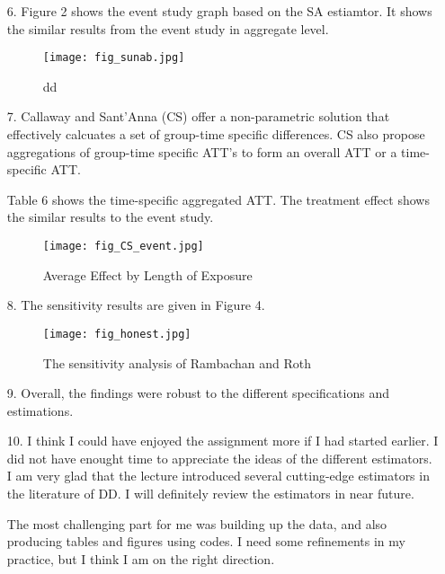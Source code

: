 \documentclass[12pt]{article}
\begin{document}
\begin{itemize}
		\item[6.] Figure 2 shows the event study graph based on the SA estiamtor. It shows the similar results from the event study in aggregate level.
		\begin{figure}
			\centering
			  \texttt{[image: fig\_sunab.jpg]}
			  \caption{dd}
		\end{figure}
		
		\item[7.] Callaway and Sant'Anna (CS) offer a non-parametric solution that effectively calcuates a set of group-time specific differences. CS also propose aggregations of group-time specific ATT's to form an overall ATT or a time-specific ATT.
		
		Table 6 shows the time-specific aggregated ATT. The treatment effect shows the similar results to the event study.
		
		\begin{tiny}
		
		\end{tiny}
	
	    \begin{figure}
	    	\texttt{[image: fig\_CS\_event.jpg]}
	    	\caption{Average Effect by Length of Exposure}
	    \end{figure}

		
		\item[8.] The sensitivity results are given in Figure 4.
		
		\begin{figure}
			\texttt{[image: fig\_honest.jpg]}
			\caption{The sensitivity analysis of  Rambachan and Roth}
		\end{figure}
		
		\item[9.] Overall, the findings were robust to the different specifications and estimations.
		
		\item[10.] I think I could have enjoyed the assignment more if I had started earlier. I did not have enought time to appreciate the ideas of the different estimators. I am very glad that the lecture introduced several cutting-edge estimators in the literature of DD. I will definitely review the estimators in near future.
		
		The most challenging part for me was building up the data, and also producing tables and figures using codes. I need some refinements in my practice, but I think I am on the right direction.
	\end{itemize}
\end{document}

